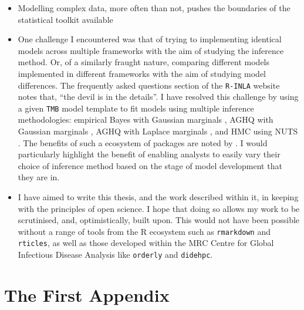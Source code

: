 \documentclass[a4paper, nobind]{templates/ociamthesis}
\providecommand{\tightlist}{%
  \setlength{\itemsep}{0pt}\setlength{\parskip}{0pt}}
\newcommand*{\bibtitle}{Works Cited}
\begin{document}
\begin{itemize}
\tightlist
\item
  Modelling complex data, more often than not, pushes the boundaries of the statistical toolkit available
\item
  One challenge I encountered was that of trying to implementing identical models across multiple frameworks with the aim of studying the inference method. Or, of a similarly fraught nature, comparing different models implemented in different frameworks with the aim of studying model differences. The frequently asked questions section of the \texttt{R-INLA} website \autocite{rinla2023faq} notes that, ``the devil is in the details''. I have resolved this challenge by using a given \texttt{TMB} model template to fit models using multiple inference methodologies: empirical Bayes with Gaussian marginals \autocite{kristensen2016tmb}, AGHQ with Gaussian marginals \autocite{stringer2021implementing}, AGHQ with Laplace marginals \autocite{howes2023integrated}, and HMC using NUTS \autocite{monnahan2018no}. The benefits of such a ecosystem of packages are noted by \textcite{stringer2021fields}. I would particularly highlight the benefit of enabling analysts to easily vary their choice of inference method based on the stage of model development that they are in.
\item
  I have aimed to write this thesis, and the work described within it, in keeping with the principles of open science. I hope that doing so allows my work to be scrutinised, and, optimistically, built upon. This would not have been possible without a range of tools from the R ecosystem such as \texttt{rmarkdown} and \texttt{rticles}, as well as those developed within the MRC Centre for Global Infectious Disease Analysis like \texttt{orderly} and \texttt{didehpc}.
\end{itemize}

\startappendices

\hypertarget{the-first-appendix}{%
\chapter{The First Appendix}\label{the-first-appendix}}




\setlength{\baselineskip}{0pt} %

{\renewcommand*\MakeUppercase[1]{#1}%
\printbibliography[heading=bibintoc,title={\bibtitle}]}
\end{document}
